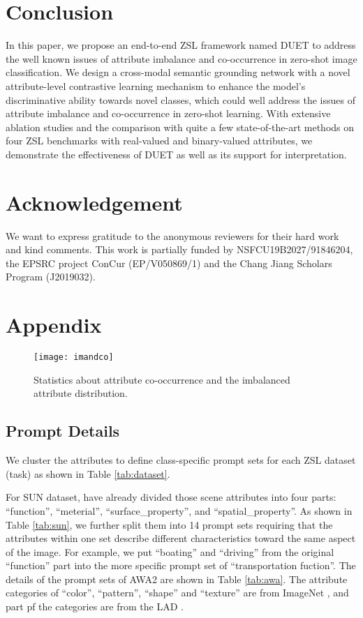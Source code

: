 \documentclass[letterpaper]{article} \usepackage{aaai23}  \usepackage{times}  \usepackage{helvet}  \usepackage{courier}  \usepackage[hyphens]{url}  \usepackage{graphicx} \urlstyle{rm} \def\UrlFont{\rm}  \usepackage{natbib}  \usepackage{caption} \frenchspacing  \setlength{\pdfpagewidth}{8.5in}  \setlength{\pdfpageheight}{11in}  \usepackage{algorithm}
\begin{document}
\section{Conclusion}
In this paper, we propose {an end-to-end ZSL framework named} DUET to address the well known issues of attribute imbalance and co-occurrence in zero-shot image classification. We design a cross-modal semantic grounding network with a novel attribute-level contrastive learning mechanism to enhance {the} model's discriminative ability toward{s} novel classes, which could well address the issues of attribute imbalance and co-occurrence in zero-shot learning.
{With extensive ablation studies and the comparison with quite a few state-of-the-art methods on four ZSL benchmarks with real-valued and binary-valued attributes, we demonstrate the effectiveness of DUET as well as its support for interpretation.}


\section*{Acknowledgement}
We want to express gratitude to the anonymous reviewers for their hard work and kind comments. This work is partially funded by NSFCU19B2027/91846204, the EPSRC project ConCur (EP/V050869/1) and the Chang Jiang Scholars
Program (J2019032).



\clearpage

\appendix
\section{Appendix}
\begin{figure*}[htbp]
  \centering
  \texttt{[image: imandco]}
   \vspace{-5pt}
  \caption{{Statistics about attribute co-occurrence and the imbalanced attribute distribution.}
\vspace{-15pt}
  }
  \label{fig:imandco}
\end{figure*}
\subsection{Prompt Details}
We cluster the attributes to define  class-specific prompt set{s} for each ZSL {dataset (task)} as shown in Table \ref{tab:dataset}.

For SUN dataset, \cite{DBLP:conf/cvpr/PattersonH12}  have already divide{d} those scene attributes into four parts: ``function'', ``meterial'', ``surface\_property'', and ``spatial\_property''.
As shown in Table \ref{tab:sun}, we further split them into 14 prompt set{s} 
requiring that the attributes within {one set}
describe different characteristics toward the same aspect of the image.
{For example, we}
put ``boating'' and ``driving'' from {the} original ``function'' {part} 
into {the more specific prompt set of ``transportation fuction''}.
The details {of the prompt sets of}
AWA2 \cite{DBLP:journals/pami/XianLSA19} are shown in Table \ref{tab:awa}.
{The attribute categories of ``color'', ``pattern'', ``shape'' and ``texture'' are from ImageNet \cite{DBLP:conf/cvpr/DengDSLL009}, and part pf the categories are from the LAD \cite{DBLP:conf/cvpr/ZhaoFLWWW19}.}
\end{document}
